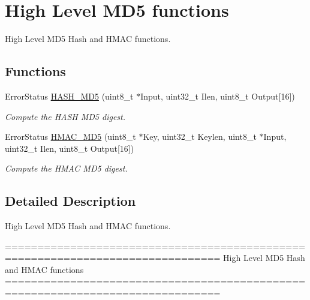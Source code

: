\hypertarget{group___h_a_s_h___group7}{\section{High Level M\-D5 functions}
\label{group___h_a_s_h___group7}
}


High Level M\-D5 Hash and H\-M\-A\-C functions.  


\subsection*{Functions}
\begin{DoxyCompactItemize}
\item 
Error\-Status \hyperlink{group___h_a_s_h___group7_ga82a155884e458cc6b7c1a4565c1ac8e9}{H\-A\-S\-H\-\_\-\-M\-D5} (uint8\-\_\-t $\ast$Input, uint32\-\_\-t Ilen, uint8\-\_\-t Output\mbox{[}16\mbox{]})
\begin{DoxyCompactList}\small\item\em Compute the H\-A\-S\-H M\-D5 digest. \end{DoxyCompactList}\item 
Error\-Status \hyperlink{group___h_a_s_h___group7_gac61733e7aa66bdd2f21be4b34165b5be}{H\-M\-A\-C\-\_\-\-M\-D5} (uint8\-\_\-t $\ast$Key, uint32\-\_\-t Keylen, uint8\-\_\-t $\ast$Input, uint32\-\_\-t Ilen, uint8\-\_\-t Output\mbox{[}16\mbox{]})
\begin{DoxyCompactList}\small\item\em Compute the H\-M\-A\-C M\-D5 digest. \end{DoxyCompactList}\end{DoxyCompactItemize}


\subsection{Detailed Description}
High Level M\-D5 Hash and H\-M\-A\-C functions. \begin{DoxyVerb} ===============================================================================
                          High Level MD5 Hash and HMAC functions
 ===============================================================================\end{DoxyVerb}
 

